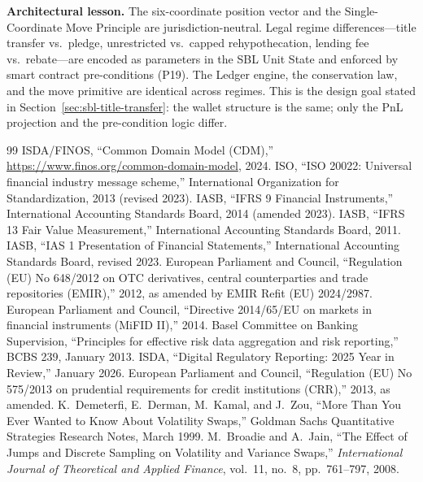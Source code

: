 \documentclass[11pt,a4paper]{article}
\begin{document}
\noindent\textbf{Architectural lesson.} The six-coordinate position vector and the Single-Coordinate Move Principle are jurisdiction-neutral. Legal regime differences---title transfer vs.\ pledge, unrestricted vs.\ capped rehypothecation, lending fee vs.\ rebate---are encoded as parameters in the SBL Unit State and enforced by smart contract pre-conditions (P19). The Ledger engine, the conservation law, and the move primitive are identical across regimes. This is the design goal stated in Section~\ref{sec:sbl-title-transfer}: the wallet structure is the same; only the PnL projection and the pre-condition logic differ.


\begin{thebibliography}{99}
 ISDA/FINOS, ``Common Domain Model (CDM),'' \url{https://www.finos.org/common-domain-model}, 2024.
 ISO, ``ISO 20022: Universal financial industry message scheme,'' International Organization for Standardization, 2013 (revised 2023).
 IASB, ``IFRS 9 Financial Instruments,'' International Accounting Standards Board, 2014 (amended 2023).
 IASB, ``IFRS 13 Fair Value Measurement,'' International Accounting Standards Board, 2011.
 IASB, ``IAS 1 Presentation of Financial Statements,'' International Accounting Standards Board, revised 2023.
 European Parliament and Council, ``Regulation (EU) No 648/2012 on OTC derivatives, central counterparties and trade repositories (EMIR),'' 2012, as amended by EMIR Refit (EU) 2024/2987.
 European Parliament and Council, ``Directive 2014/65/EU on markets in financial instruments (MiFID II),'' 2014.
 Basel Committee on Banking Supervision, ``Principles for effective risk data aggregation and risk reporting,'' BCBS 239, January 2013.
 ISDA, ``Digital Regulatory Reporting: 2025 Year in Review,'' January 2026.
 European Parliament and Council, ``Regulation (EU) No 575/2013 on prudential requirements for credit institutions (CRR),'' 2013, as amended.
 K.~Demeterfi, E.~Derman, M.~Kamal, and J.~Zou, ``More Than You Ever Wanted to Know About Volatility Swaps,'' Goldman Sachs Quantitative Strategies Research Notes, March 1999.
 M.~Broadie and A.~Jain, ``The Effect of Jumps and Discrete Sampling on Volatility and Variance Swaps,'' \textit{International Journal of Theoretical and Applied Finance}, vol.~11, no.~8, pp.~761--797, 2008.

\end{thebibliography}
\end{document}
